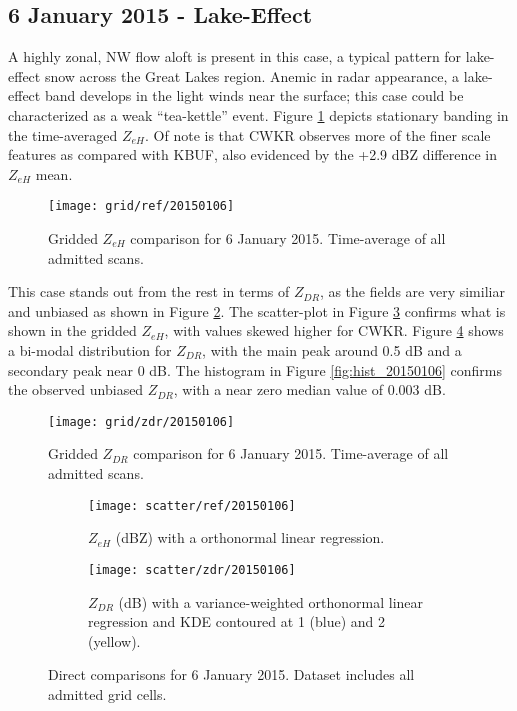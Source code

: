 \subsection{6 January 2015 - Lake-Effect}
A highly zonal, NW flow aloft is present in this case, a typical pattern for lake-effect snow across the Great Lakes region. Anemic in radar appearance, a
lake-effect band develops in the light winds near the surface; this case could be characterized as a weak ``tea-kettle'' event. Figure
\ref{fig:grid_ref_20150106} depicts stationary banding in the time-averaged $Z_{eH}$. Of note is that CWKR observes more of the finer scale features as
compared with KBUF, also evidenced by the +2.9 dBZ difference in $Z_{eH}$ mean. 
\begin{figure}[H]
\texttt{[image: grid/ref/20150106]}
\caption{Gridded $Z_{eH}$ comparison for 6 January 2015. Time-average of all admitted scans.} 
\label{fig:grid_ref_20150106}
\end{figure}
This case stands out from the rest in terms of $Z_{DR}$, as the fields are
very similiar and unbiased as shown in Figure \ref{fig:grid_zdr_20150106}. The scatter-plot in Figure
\ref{fig:scatter_ref_20150106} confirms what is shown in the gridded $Z_{eH}$, with values skewed higher for CWKR. Figure \ref{fig:scatter_zdr_20150106}
shows a bi-modal distribution for $Z_{DR}$, with the
main peak around 0.5 dB and a secondary peak near 0 dB. The histogram in Figure
\ref{fig:hist_20150106} confirms the observed unbiased $Z_{DR}$, with a near zero median value of 0.003 dB.


\begin{figure}[H]
\texttt{[image: grid/zdr/20150106]}
\caption{Gridded $Z_{DR}$ comparison for 6 January 2015. Time-average of all admitted scans.} 
\label{fig:grid_zdr_20150106}
\end{figure}

\begin{figure}[H]
\centering
   \begin{subfigure}[t]{0.48\linewidth} \centering
     \texttt{[image: scatter/ref/20150106]}
     \caption{$Z_{eH}$ (dBZ) with a orthonormal linear regression.}\label{fig:scatter_ref_20150106}
   \end{subfigure}
   \begin{subfigure}[t]{0.48\linewidth} \centering
     \texttt{[image: scatter/zdr/20150106]}
     \caption{$Z_{DR}$ (dB) with a variance-weighted orthonormal linear regression and KDE contoured at 1 (blue) and 2 (yellow).}\label{fig:scatter_zdr_20150106}
   \end{subfigure}
\caption{Direct comparisons for 6 January 2015. Dataset includes all admitted grid cells.} \label{fig:scatter_20150106}
\end{figure}

